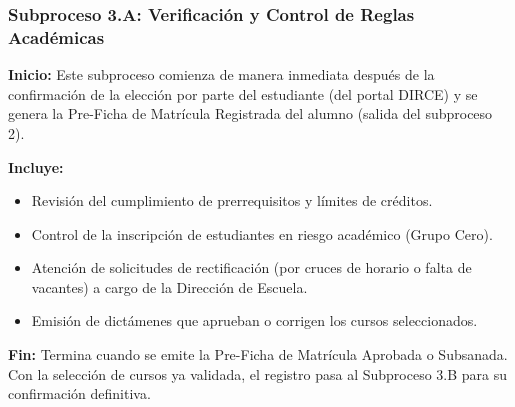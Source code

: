 \subsubsection{Subproceso 3.A: Verificación y Control de Reglas Académicas}

\textbf{Inicio:} Este subproceso comienza de manera inmediata despu\'es de la confirmaci\'on de la elecci\'on por parte del estudiante (del portal DIRCE) y se genera la Pre-Ficha de Matr\'icula Registrada del alumno (salida del subproceso 2).

\textbf{Incluye:}
\begin{itemize}
    \item Revisión del cumplimiento de prerrequisitos y límites de créditos.
    \item Control de la inscripción de estudiantes en riesgo académico (Grupo Cero).
    \item Atención de solicitudes de rectificación (por cruces de horario o falta de vacantes) a cargo de la Dirección de Escuela.
    \item Emisión de dictámenes que aprueban o corrigen los cursos seleccionados.
\end{itemize}

\textbf{Fin:} Termina cuando se emite la Pre-Ficha de Matrícula Aprobada o Subsanada. Con la selección de cursos ya validada, el registro pasa al Subproceso 3.B para su confirmación definitiva.
